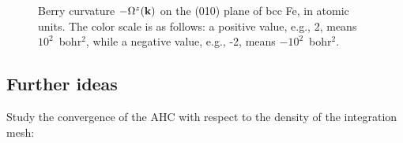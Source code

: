 \documentclass[a4paper,11pt,twoside]{article}
\begin{document}
\begin{figure}[h]
\begin{center}
\caption{Berry curvature $-\Omega^z({\bf k})$ on the (010) plane of
  bcc Fe, in atomic units.  The color scale is as follows:
  a positive value, e.g., 2, means $10^2$~bohr$^2$, while a negative value,
  e.g., -2, means $-10^2$~bohr$^2$.}
\label{fig:fe-curv-slice}
\end{center}
\end{figure}

\subsection*{Further ideas}

Study the convergence of the AHC with respect to the density of
  the integration mesh:
\end{document}
